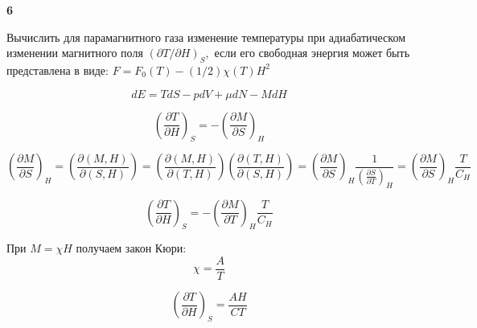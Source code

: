 \documentclass[a4paper,12pt]{article} %
\newcommand{\parder}[2]{\frac{\partial {#1}}{\partial {#2}}}
\begin{document}
\begin{ttask}\textbf{6}

Вычислить для парамагнитного газа изменение температуры при адиабатическом изменении магнитного поля $(\partial T / \partial H)_{S},$ 
если его свободная энергия может быть представлена в виде: $F=F_{0}(T)-(1 / 2) \chi(T) H^{2}$


\[ dE=TdS-pdV+\mu dN-MdH \]

\[ \left(\parder{T}{H}\right)_S=-\left(\parder{M}{S}\right)_H \]



\[ \left(\parder{M}{S}\right)_H=
\left(\parder{(M,H)}{(S,H)}\right)=
\left(\parder{(M,H)}{(T,H)}\right)\left(\parder{(T,H)}{(S,H)}\right)=
\left(\parder{M}{S}\right)_H \frac{1}{\left(\parder{S}{T}\right)_H}=\left(\parder{M}{S}\right)_H \frac{T}{C_H}
\]


\[ \left(\parder{T}{H}\right)_S=- \left(\parder{M}{T}\right)_H \frac{T}{C_H}\]

При $ M=\chi H$ получаем закон Кюри:
\[ \chi = \frac{A}{T} \]

\[ \left(\parder{T}{H}\right)_S=\frac{AH}{C T}\]





\end{ttask}
\end{document}
